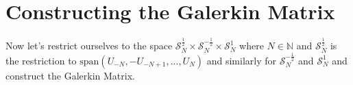 \documentclass[10pt,journal,compsoc, onecolumn]{IEEEtran}
\begin{document}

\section{Constructing the Galerkin Matrix}
Now let's restrict ourselves to the space $\mathcal{S}_N^{\frac{1}{2}} 
\times \mathcal{S}_N^{-\frac{1}{2}} \times \mathcal{S}_N^{1}$ where $N \in \mathbb{N}$ 
and $\mathcal{S}_N^{\frac{1}{2}}$ is the restriction to $\mathrm{span}(U_{-N}, -U_{-N+1}, ..., U_N)$ and similarly 
for $\mathcal{S}_N^{-\frac{1}{2}}$ and $\mathcal{S}_N^{1}$ and construct the Galerkin Matrix.
\end{document}
